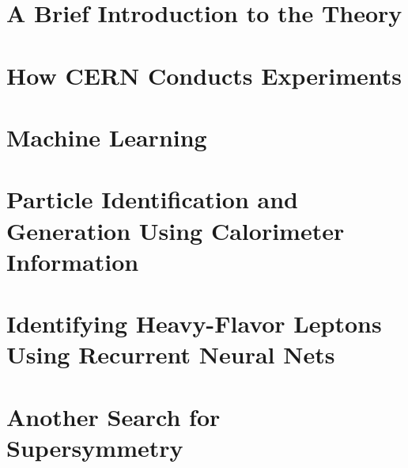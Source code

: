 \documentclass[draftthesis,fancy,edeposit]{uiuc_thesis_template}
\begin{document}


\part{A Brief Introduction to the Theory}




\part{How CERN Conducts Experiments}




\part{Machine Learning}



\part{Particle Identification and Generation Using Calorimeter Information}


\part{Identifying  Heavy-Flavor  Leptons  Using  Recurrent  Neural Nets}


\part{Another Search for Supersymmetry}


\appendix
%

\backmatter
%
\end{document}
